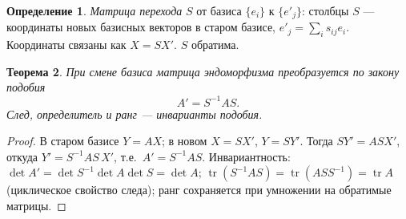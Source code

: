 \documentclass[11pt,a4paper]{article}
\theoremstyle{definition}
\newtheorem{definition}{Определение}[section]
\theoremstyle{plain}
\newtheorem{theorem}[definition]{Теорема}
\DeclareMathOperator{\tr}{tr}
\begin{document}
\begin{definition}
\emph{Матрица перехода} $S$ от базиса $\{e_i\}$ к $\{e'_j\}$: столбцы $S$ — координаты новых
базисных векторов в старом базисе, $e'_j=\sum_i s_{ij}e_i$. Координаты связаны как $X=SX'$. $S$
обратима.
\end{definition}

\begin{theorem}
При смене базиса матрица эндоморфизма преобразуется по закону подобия
\[
  A'=S^{-1}AS .
\]
След, определитель и ранг — инварианты подобия.
\end{theorem}

\begin{proof}
В старом базисе $Y=AX$; в новом $X=SX'$, $Y=SY'$. Тогда $SY'=ASX'$, откуда
$Y'=S^{-1}AS\,X'$, т.е.\ $A'=S^{-1}AS$. Инвариантность:
$\det A'=\det S^{-1}\det A\det S=\det A$; $\tr(S^{-1}AS)=\tr(ASS^{-1})=\tr A$ (циклическое свойство
следа); ранг сохраняется при умножении на обратимые матрицы.
\end{proof}
\end{document}
